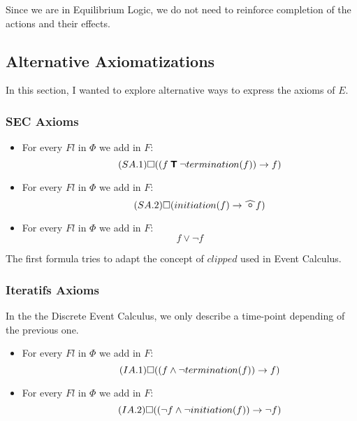 Since we are in Equilibrium Logic, we do not need to reinforce completion of the actions and their effects.

\subsection{Alternative Axiomatizations}

In this section, I wanted to explore alternative ways to express the axioms of $E$.

\subsubsection{SEC Axioms}

\begin{itemize}
  \item
    For every $Fl$ in $\Phi$ we add in $F$:
    \begin{equation}\tag{$SA.1$}
      \square((f \mathbin{\bm{\mathsf{T}}} \neg termination(f)) \rightarrow f)
    \end{equation}
  \item
    For every $Fl$ in $\Phi$ we add in $F$:
    \begin{equation}\tag{$SA.2$}
      \alwaysF(initiation(f)\rightarrow\wnext f)
    \end{equation}
  \item
    For every $Fl$ in $\Phi$ we add in $F$:
    \begin{equation}\tag{$A.3$}
      f \lor \neg f
    \end{equation}
\end{itemize}

The first formula tries to adapt the concept of $clipped$ used in Event Calculus.

\subsubsection{Iteratifs Axioms}\label{sec:iter}

In the the Discrete Event Calculus, we only describe a time-point depending of the previous one.

\begin{itemize}
  \item
    For every $Fl$ in $\Phi$ we add in $F$:
    \begin{equation}\tag{$IA.1$}
      \square((f \land \neg termination(f)) \rightarrow f)
    \end{equation}
  \item
    For every $Fl$ in $\Phi$ we add in $F$:
    \begin{equation}\tag{$IA.2$}
      \square((\neg f \land \neg initiation(f)) \rightarrow \neg f)
    \end{equation}
\end{itemize}

